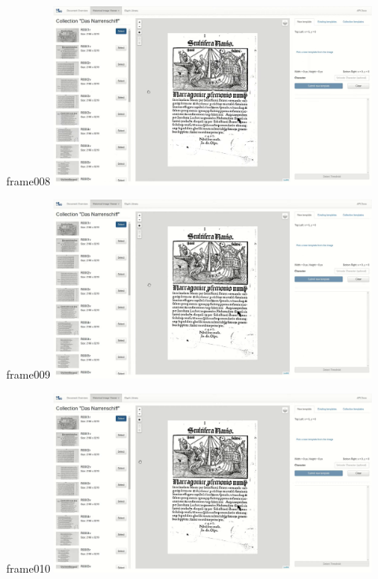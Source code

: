 \documentclass{beamer}
\begin{document}
\begin{frame}{frame008}
\includegraphics[width=0.8\textwidth]{output/exported-frames/frame008.png}
\note{}
\end{frame}

\begin{frame}{frame009}
\includegraphics[width=0.8\textwidth]{output/exported-frames/frame009.png}
\note{}
\end{frame}

\begin{frame}{frame010}
\includegraphics[width=0.8\textwidth]{output/exported-frames/frame010.png}
\note{}
\end{frame}
\end{document}
